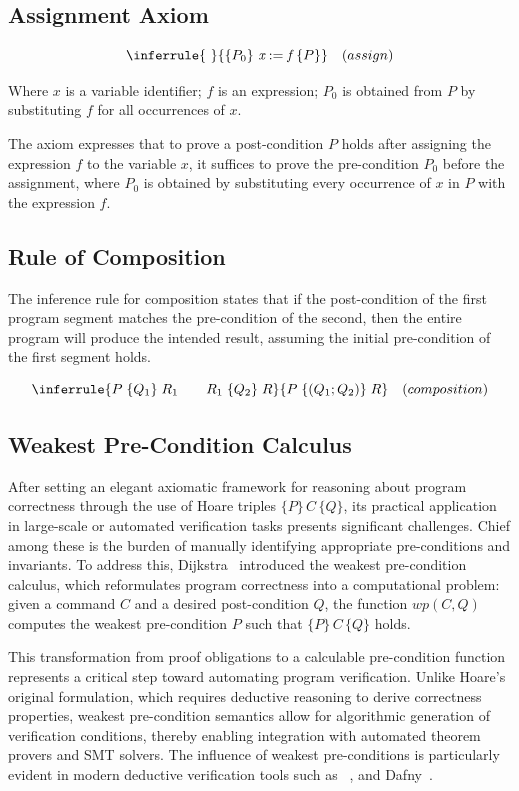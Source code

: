 \subsection{Assignment Axiom}

\[ 
  \inferrule
  { \ }
  {\{P_0\} \ \textit{x} := \textit{f} \ \{P\}}
  \quad (assign)
\]

Where $x$ is a variable identifier; $f$ is an expression; $P_0$ is obtained from $P$ by substituting $f$ for all occurrences 
of $x$.

The axiom expresses that to prove a post-condition $P$ holds after assigning the expression $f$ to the variable $x$,
it suffices to prove the pre-condition $P_0$ before the assignment, where $P_0$ is obtained by substituting every occurrence of
$x$ in $P$ with the expression $f$.

\subsection{Rule of Composition}

The inference rule for composition states that if the post-condition of the first program segment matches the pre-condition 
of the second, then the entire program will produce the intended result, assuming the initial pre-condition of the first 
segment holds.

\[ 
  \inferrule
  {P\; \{ Q_1 \} \;R_1 \quad \quad  R_1\; \{ Q_2 \} \;R}
  {P\; \{ (Q_1 ; Q_2) \} \;R} 
  \quad (composition)
\]

\subsection{Weakest Pre-Condition Calculus}

After setting an elegant axiomatic framework for reasoning about program correctness through the use of Hoare triples 
$\{P\}\,C\,\{Q\}$, its practical application in large-scale or automated verification tasks presents significant challenges. 
Chief among these is the burden of manually identifying appropriate pre-conditions and invariants. To address this, 
Dijkstra~\cite{Dijkstra76} introduced the weakest pre-condition calculus, which reformulates program correctness into a computational 
problem: given a command $C$ and a desired post-condition $Q$, the function $wp(C,Q)$ computes the weakest pre-condition $P$ 
such that $\{P\}\,C\,\{Q\}$ holds.

This transformation from proof obligations to a calculable pre-condition function represents a critical step toward automating 
program verification. Unlike Hoare's original formulation, which requires deductive reasoning to derive correctness properties, 
weakest pre-condition semantics allow for algorithmic generation of verification conditions, thereby enabling integration 
with automated theorem provers and SMT solvers. The influence of weakest pre-conditions is particularly evident in modern 
deductive verification tools such as \whythree~\cite{boogie11why3}, and \textsf{Dafny}~\cite{Leino10}.


